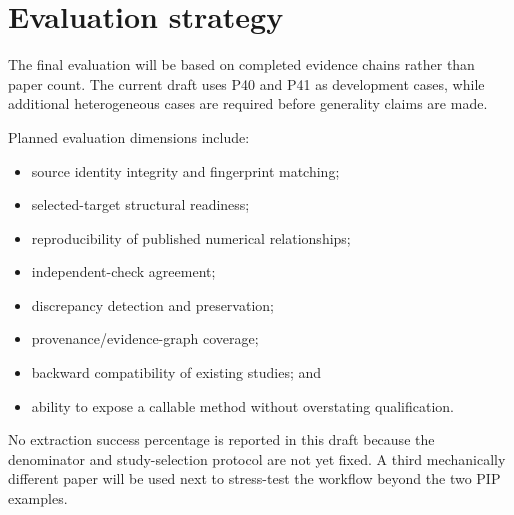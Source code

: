 \section{Evaluation strategy}
The final evaluation will be based on completed evidence chains rather than paper count. The current draft uses P40 and P41 as development cases, while additional heterogeneous cases are required before generality claims are made.

Planned evaluation dimensions include:
\begin{itemize}[leftmargin=1.5em]
  \item source identity integrity and fingerprint matching;
  \item selected-target structural readiness;
  \item reproducibility of published numerical relationships;
  \item independent-check agreement;
  \item discrepancy detection and preservation;
  \item provenance/evidence-graph coverage;
  \item backward compatibility of existing studies; and
  \item ability to expose a callable method without overstating qualification.
\end{itemize}

No extraction success percentage is reported in this draft because the denominator and study-selection protocol are not yet fixed. A third mechanically different paper will be used next to stress-test the workflow beyond the two PIP examples.
